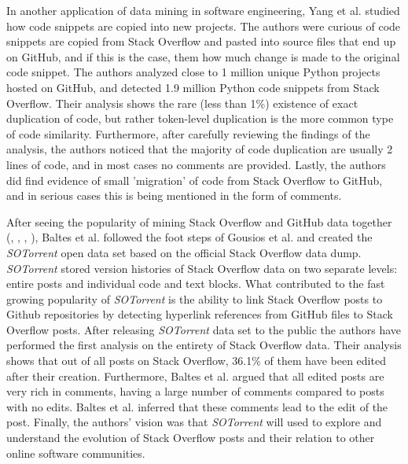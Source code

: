         In another application of data mining in software engineering, Yang et al. \cite{yang2017stack} studied how code snippets are copied into new projects. The authors were curious of code snippets are copied from Stack Overflow and pasted into source files that end up on GitHub, and if this is the case, them how much change is made to the original code snippet. The authors analyzed close to 1 million unique Python projects hosted on GitHub, and detected 1.9 million Python code snippets from Stack Overflow. Their analysis shows the rare (less than 1\%) existence of exact duplication of code, but rather token-level duplication is the more common type of code similarity. Furthermore, after carefully reviewing the findings of the analysis, the authors noticed that the majority of code duplication are usually 2 lines of code, and in most cases no comments are provided. Lastly, the authors did find evidence of small 'migration' of code from Stack Overflow to GitHub, and in serious cases this is being mentioned in the form of comments.
        
        After seeing the popularity of mining Stack Overflow and GitHub data together (\cite{vasilescu2013stackoverflow}, \cite{lee2017github}, \cite{badashian2014involvement}, \cite{yang2017stack}), Baltes et al. \cite{baltes2018sotorrent} followed the foot steps of Gousios et al. \cite{gousios2013ghtorent} and created the \emph{SOTorrent} open data set based on the official Stack Overflow data dump. \emph{SOTorrent} stored version histories of Stack Overflow data on two separate levels: entire posts and individual code and text blocks. What contributed to the fast growing popularity of \emph{SOTorrent} is the ability to link Stack Overflow posts to Github repositories by detecting hyperlink references from GitHub files to Stack Overflow posts. After releasing \emph{SOTorrent} data set to the public the authors have performed the first analysis on the entirety of Stack Overflow data. Their analysis shows that out of all posts on Stack Overflow, 36.1\% of them have been edited after their creation. Furthermore, Baltes et al. argued that all edited posts are very rich in comments, having a large number of comments compared to posts with no edits. Baltes et al. inferred that these comments lead to the edit of the post.
        Finally, the authors' vision was that \emph{SOTorrent} will used to explore and understand the evolution of Stack Overflow posts and their relation to other online software communities.
        
